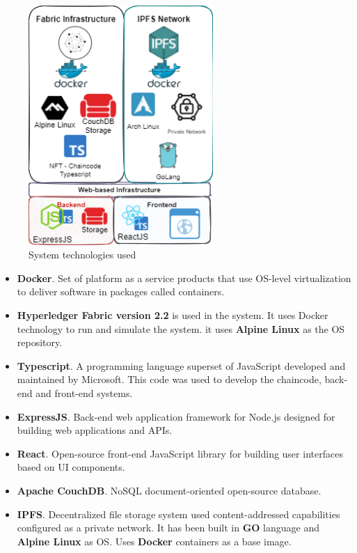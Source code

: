 \documentclass[a4paper]{article}
\begin{document}
\begin{figure}[ht]
    \centering
    \includegraphics[width=7cm]{img/System-Technologies.png}
    \caption{System technologies used}
    \label{fig:SystemTechUSed}
\end{figure}

\begin{itemize}
    \item \textbf{Docker}. Set of platform as a service products that use OS-level virtualization to deliver software in packages called containers.
    \item \textbf{Hyperledger Fabric version 2.2} is used in the system. It uses Docker technology to run and simulate the system. it uses \textbf{Alpine Linux} as the OS repository.\cite{HyperledgerFabric:online}
    \item \textbf{Typescript}. A programming language superset of JavaScript developed and maintained by Microsoft. This code was used to develop the chaincode, back-end and front-end systems.
    \item \textbf{ExpressJS}. Back-end web application framework for Node.js designed for building web applications and APIs.
    \item \textbf{React}. Open-source front-end JavaScript library for building user interfaces based on UI components.
    \item \textbf{Apache CouchDB}. NoSQL document-oriented open-source database.
    \item \textbf{IPFS}\cite{benet2014ipfs}. Decentralized file storage system used content-addressed capabilities configured as a private network. It has been built in \textbf{GO} language and  \textbf{Alpine Linux} as OS. Uses \textbf{Docker} containers as a base image.
\end{itemize}
\end{document}
